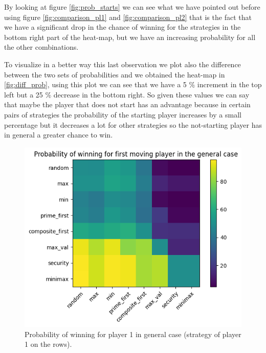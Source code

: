 By looking at figure \ref{fig:prob_starts} we can see what we have pointed out before using figure \ref{fig:comparison_pl1} and \ref{fig:comparison_pl2} that is the fact that we have a significant drop in the chance of winning for the strategies in the bottom right part of the heat-map, but we have an increasing probability for all the other combinations.

To visualize in a better way this last observation we plot also the difference between the two sets of probabilities and we obtained the heat-map in \ref{fig:diff_prob}, using this plot we can see that we have a 5 \% increment in the top left but a 25 \% decrease in the bottom right. So given these values we can say that maybe the player that does not start has an advantage because in certain pairs of strategies the probability of the starting player increases by a small percentage but it decreases a lot for other strategies so the not-starting player has in general a greater chance to win.

\begin{figure}
    \centering
    \includegraphics[width=0.9\linewidth]{img/prob_winning_general.png}
    \caption{Probability of winning for player 1 in general case (strategy of player 1 on the rows).}
    \label{fig:prob_general}
\end{figure}

